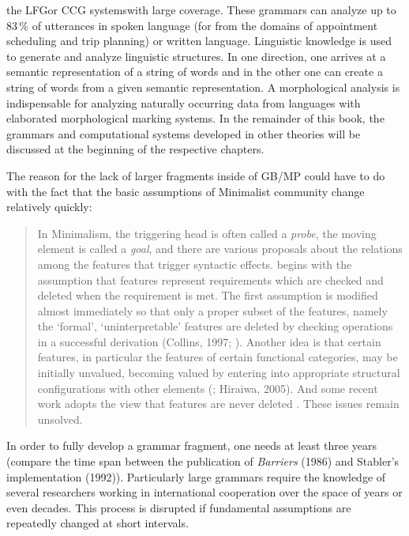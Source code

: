 the LFG\indexlfg or CCG systems\indexccg with large coverage. These grammars can analyze up to 83\,\% of utterances in spoken language
(for \verbmobil from the domains of appointment scheduling and trip planning) or written language. Linguistic knowledge is used to generate and analyze 
linguistic structures. In one direction, one arrives at a semantic representation of a string of words and in the other one can create a string
of words from a given semantic representation. A morphological analysis is indispensable for analyzing naturally occurring data from languages with
elaborated morphological marking systems. In the remainder of this book, the grammars and computational systems developed in other theories will be discussed at the beginning of the
respective chapters.

The reason for the lack of larger fragments inside of GB/MP could have to do with the fact that the basic assumptions of Minimalist community
change relatively quickly:
\begin{quote}
\label{Zitat-Stabler}
In Minimalism, the triggering head is often called a \emph{probe}, the moving element is called a
\emph{goal}, and there are various proposals about the relations among the features that trigger
syntactic effects. \citet[p.\,229]{Chomsky95a-u} begins with the assumption that features represent
requirements which are checked and deleted when the requirement is met. The first assumption is
modified almost immediately so that only a proper subset of the features, namely the `formal',
`uninterpretable' features are deleted by checking operations in a successful derivation (Collins,
1997; \citealp[§4.5]{Chomsky95a-u}). Another idea is that certain features, in particular the
features of certain functional categories, may be initially unvalued, becoming valued by entering
into appropriate structural configurations with other elements (\citealp{Chomsky2008a}; Hiraiwa,
2005). And some recent work adopts the view that features are never deleted
\citep[p.\,11]{Chomsky2007a}. These issues remain unsolved. \citep[]{Stabler2010a} 
\end{quote}
In order to fully develop a grammar fragment, one needs at least three years (compare the time span between the publication of \emph{Barriers} (1986)
and Stabler's implementation (1992)). Particularly large grammars require the knowledge of several researchers working in international cooperation
over the space of years or even decades. This process is disrupted if fundamental assumptions are repeatedly changed at short intervals.




